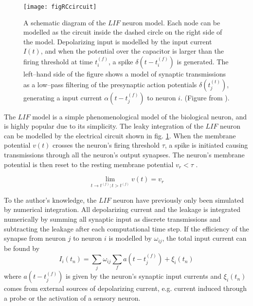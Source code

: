 	
\begin{figure}[tb!hp]
	\centering
	\texttt{[image: figRCcircuit]}
	\caption{A schematic diagram of the $LIF$ neuron model. 
			Each node can be modelled as the circuit inside the dashed circle on the right side of the model.
			Depolarizing input is modelled by the input current $I(t)$, and when the potential over the capacitor is larger than the firing threshold at time $t_i^{(f)}$, a spike $\delta(t-t_i^{(f)})$ is generated. 
			The left--hand side of the figure shows a model of synaptic transmissions as a low--pass filtering of the presynaptic action potentials $\delta(t_j^{(t)})$, generating a input current $\alpha(t-t_j^{(f)})$ to neuron $i$.
			(Figure from \cite{gerstnerKistler2002KAP04}).
			}
	\label{figRCcircuitAvNeuronet}
\end{figure}
	The $LIF$ model is a simple phenomenological model of the biological neuron, and is highly popular due to its simplicity.
	The leaky integration of the $LIF$ neuron can be modelled by the electrical circuit shown in fig. \ref{figRCcircuitAvNeuronet}.
	When the membrane potential $v(t)$ crosses the neuron's firing threshold $\tau$, a spike is initiated causing transmissions through all the neuron's output synapses.
	The neuron's membrane potential is then reset to the resting membrane potential $v_r<\tau$ \cite{gerstnerKistler2002KAP04}.

\begin{equation}
	\lim\limits_{t\to t^{(f)}; t>t^{(f)}} v(t) = v_r
\end{equation}

	To the author's knowledge, the $LIF$ neuron have previously only been simulated by numerical integration.
	All depolarizing current and the leakage is integrated numerically by summing all synaptic input as discrete transmissions and subtracting the leakage after each computational time step.
	If the efficiency of the synapse from neuron $j$ to neuron $i$ is modelled by $\omega_{ij}$, the total input current can be found by 
\begin{equation}
	I_i(t_n) = \sum_j \omega_{ij} \sum_f a(t - t_j^{(f)}) + \xi_i(t_n)
\end{equation}
	where $a(t- t_j^{(f)})$ is given by the neuron's synaptic input currents and $\xi_i(t_n)$ comes from external sources of depolarizing current, e.g. current induced through a probe or the activation of a sensory neuron\cite{florian03}.

